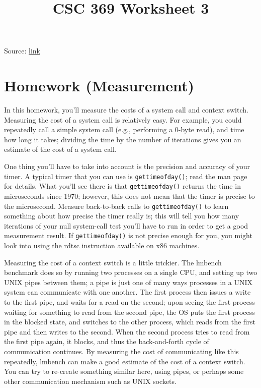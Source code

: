 \documentclass[12pt]{article}
\begin{document}
\title{CSC 369 Worksheet 3}
\maketitle

\bigskip

Source: \href{http://pages.cs.wisc.edu/~remzi/Classes/537/Spring2018/Book/cpu-mechanisms.pdf}{link}

\bigskip

\section{Homework (Measurement)}

In this homework, you’ll measure the costs of a system call and context
switch. Measuring the cost of a system call is relatively easy. For example,
you could repeatedly call a simple system call (e.g., performing a 0-byte
read), and time how long it takes; dividing the time by the number of
iterations gives you an estimate of the cost of a system call.

\bigskip

One thing you’ll have to take into account is the precision and accuracy of your timer.
A typical timer that you can use is \texttt{gettimeofday()}; read the man page for details.
What you’ll see there is that \texttt{gettimeofday()}
returns the time in microseconds since 1970; however, this does not mean
that the timer is precise to the microsecond. Measure back-to-back calls
to \texttt{gettimeofday()} to learn something about how precise the timer really is; this will tell you how many iterations of your null system-call
test you’ll have to run in order to get a good measurement result. If
\texttt{gettimeofday()} is not precise enough for you, you might look into
using the rdtsc instruction available on x86 machines.

\bigskip

Measuring the cost of a context switch is a little trickier. The lmbench
benchmark does so by running two processes on a single CPU, and setting up two UNIX pipes between them; a pipe is just one of many ways
processes in a UNIX system can communicate with one another. The first
process then issues a write to the first pipe, and waits for a read on the
second; upon seeing the first process waiting for something to read from
the second pipe, the OS puts the first process in the blocked state, and
switches to the other process, which reads from the first pipe and then
writes to the second. When the second process tries to read from the first
pipe again, it blocks, and thus the back-and-forth cycle of communication
continues. By measuring the cost of communicating like this repeatedly,
lmbench can make a good estimate of the cost of a context switch. You
can try to re-create something similar here, using pipes, or perhaps some
other communication mechanism such as UNIX sockets.
\end{document}
